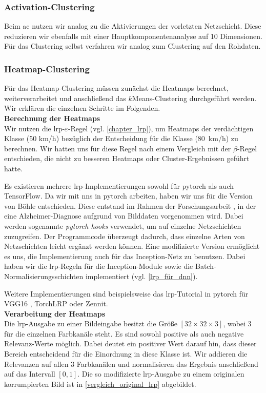 \documentclass[twoside, 12pt,a4paper]{book}
\numberwithin{equation}{section}
\begin{document}
	\subsubsection{Activation-Clustering}
	Beim \ac{ac} nutzen wir analog zu \cite{AC} die Aktivierungen der vorletzten Netzschicht. Diese reduzieren wir ebenfalls mit einer Hauptkomponentenanalyse auf 10 Dimensionen. Für das Clustering selbst verfahren wir analog zum Clustering auf den Rohdaten.
	
	\subsubsection{Heatmap-Clustering}
	Für das Heatmap-Clustering müssen zunächst die Heatmaps berechnet, weiterverarbeitet und anschließend das $k$Means-Clustering durchgeführt werden. Wir erklären die einzelnen Schritte im Folgenden.\\
	
	\noindent\textbf{Berechnung der Heatmaps}\\
	Wir nutzen die \ac{lrp}-$\varepsilon$-Regel (vgl. \autoref{chapter_lrp}), um Heatmaps der verdächtigen Klasse (50 km/h) bezüglich der Entscheidung für die Klasse (80~km/h) zu berechnen. Wir hatten uns für diese Regel nach einem Vergleich mit der $\beta$-Regel entschieden, die nicht zu besseren Heatmaps oder Cluster-Ergebnissen geführt hatte.
	
	\noindent Es existieren mehrere \ac{lrp}-Implementierungen sowohl für pytorch als auch TensorFlow. Da wir mit \acp{nn} in pytorch arbeiten, haben wir uns für die Version von Böhle \cite{moboehle} entschieden. Diese entstand im Rahmen der Forschungsarbeit \cite{lrp_alzheimer}, in der eine Alzheimer-Diagnose aufgrund von Bilddaten vorgenommen wird. Dabei werden sogenannte \textit{pytorch hooks} verwendet, um auf einzelne Netzschichten zuzugreifen. Der Programmcode überzeugt dadurch, dass einzelne Arten von Netzschichten leicht ergänzt werden können. Eine modifizierte Version ermöglicht es uns, die Implementierung auch für das Inception-Netz zu benutzen. Dabei haben  wir die \ac{lrp}-Regeln für die Inception-Module sowie die Batch-Normalisierungsschichten implementiert (vgl. \autoref{lrp_für_dnn}).
	
	\noindent Weitere Implementierungen sind beispielsweise das \ac{lrp}-Tutorial in pytorch für VGG16 \cite{lrpmontavon}, TorchLRP \cite{torchlrp} oder Zennit\cite{zennit}.\\
	
	\noindent\textbf{Verarbeitung der Heatmaps}\\
	Die \ac{lrp}-Ausgabe zu einer Bildeingabe besitzt die Größe $[32 \times 32 \times 3]$, wobei 3 für die einzelnen Farbkanäle steht. Es sind sowohl positive als auch negative Relevanz-Werte möglich. Dabei deutet ein positiver Wert darauf hin, dass dieser Bereich entscheidend für die Einordnung in diese Klasse ist. Wir addieren die Relevanzen auf allen 3 Farbkanälen und normalisieren das Ergebnis anschließend auf das Intervall $[0,1]$. Die so modifizierte \ac{lrp}-Ausgabe zu einem originalen korrumpierten Bild ist in \autoref{vergleich_original_lrp} abgebildet. \\
	
\end{document}
